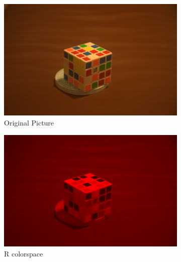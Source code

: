 \documentclass{article}
\begin{document}
\begin{figure}[h]
\centering
\begin{subfigure}[b]{0.4\textwidth}
\caption{Original Picture}
\begin{center}
	\includegraphics[width=\textwidth]{./implementation/experiment/out.png}
\end{center}
\end{subfigure}%
\begin{subfigure}[b]{0.4\textwidth}
\caption{R colorspace}
\begin{center}
	\includegraphics[width=\textwidth]{./implementation/experiment/red.png}
\end{center}
\end{subfigure}
\begin{subfigure}[b]{0.4\textwidth}
\begin{center}

\end{center}
\end{subfigure}
\end{figure}
\end{document}
